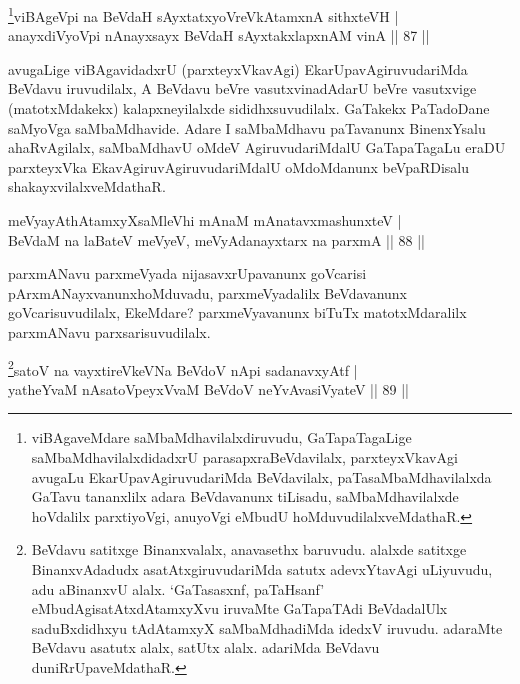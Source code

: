 \begin{shl}
\footnote{viBAgaveMdare saMbaMdhavilalxdiruvudu, GaTapaTagaLige saMbaMdhavilalxdidadxrU parasapxraBeVdavilalx, parxteyxVkavAgi avugaLu EkarUpavAgiruvudariMda BeVdavilalx, paTasaMbaMdhavilalxda GaTavu tananxlilx adara BeVdavanunx tiLisadu, saMbaMdhavilalxde hoVdalilx parxtiyoVgi, anuyoVgi eMbudU hoMduvudilalxveMdathaR.}viBAgeV\s pi na BeVdaH sAyxtatxyoVreVkAtamxnA sithxteVH  | \\
anayxdiVyoV\s pi nAnayxsayx BeVdaH sAyxtakxlapxnAM vinA \hfill||  87 ||  
\end{shl}

\begin{artha}
avugaLige viBAgavidadxrU (parxteyxVkavAgi) EkarUpavAgiruvudariMda BeVdavu iruvudilalx, A BeVdavu beVre vasutxvinadAdarU beVre vasutxvige (matotxMdakekx) kalapxneyilalxde sididhxsuvudilalx. GaTakekx PaTadoDane saMyoVga saMbaMdhavide. Adare I saMbaMdhavu paTavanunx BinenxYsalu ahaRvAgilalx, saMbaMdhavU oMdeV AgiruvudariMdalU GaTapaTagaLu eraDU parxteyxVka EkavAgiruvAgiruvudariMdalU oMdoMdanunx beVpaRDisalu shakayxvilalxveMdathaR. 
\end{artha}


\begin{shl}
meVyayAthAtamxyXsaMleVhi mAnaM mAnatavxmashunxteV  | \\
BeVdaM na laBateV meVyeV, meVyAdanayxtarx na parxmA \hfill||  88 ||  
\end{shl}

\begin{artha}
parxmANavu parxmeVyada nijasavxrUpavanunx goVcarisi pArxmANayxvanunx\break hoMduvadu, parxmeVyadalilx BeVdavanunx goVcarisuvudilalx, EkeMdare? parxmeVyavanunx biTuTx matotxMdaralilx parxmANavu parxsarisuvudilalx.
\end{artha}

\begin{shl}
\footnote{BeVdavu satitxge Binanxvalalx, anavasethx baruvudu. alalxde satitxge BinanxvAdadudx asatAtxgiruvudariMda satutx adevxYtavAgi uLiyuvudu, adu aBinanxvU alalx. `GaTasasxnf, paTaHsanf' eMbudAgi\break satAtxdAtamxyXvu iruvaMte GaTapaTAdi BeVdadalUlx saduBxdidhxyu tAdAtamxyX saMbaMdhadiMda idedxV iruvudu. adaraMte BeVdavu asatutx alalx, satUtx alalx. adariMda BeVdavu duniRrUpaveMdathaR.}satoV na vayxtireVkeVNa BeVdoV nApi sadanavxyAtf  | \\
yatheYvaM nAsatoV\s peyxVvaM BeVdoV neYvAvasiVyateV \hfill||  89 ||  
\end{shl}

